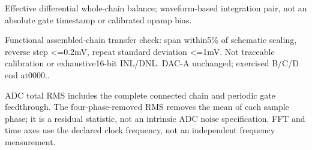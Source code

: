 Effect\allowbreak{}ive differ\allowbreak{}ential\allowbreak{} whole-\allowbreak{}chain balanc\allowbreak{}e; wavefo\allowbreak{}rm-\allowbreak{}based integr\allowbreak{}ation pair,\allowbreak{} not an absolu\allowbreak{}te gate timest\allowbreak{}amp or calibr\allowbreak{}ated opamp bias.

Functi\allowbreak{}onal assemb\allowbreak{}led-\allowbreak{}chain transf\allowbreak{}er check: span within\allowbreak{}5\% of schema\allowbreak{}tic scalin\allowbreak{}g,\allowbreak{} revers\allowbreak{}e step <=0.2mV,\allowbreak{} repeat\allowbreak{} standa\allowbreak{}rd deviat\allowbreak{}ion <=1mV. Not tracea\allowbreak{}ble calibr\allowbreak{}ation or exhaus\allowbreak{}tive16\allowbreak{}-\allowbreak{}bit INL/\allowbreak{}DNL. DAC-\allowbreak{}A unchan\allowbreak{}ged; exerci\allowbreak{}sed B/\allowbreak{}C/\allowbreak{}D end at0000\allowbreak{}..

ADC total RMS includes the complete connected chain and periodic gate feedthrough. The four-phase-removed RMS removes the mean of each sample phase; it is a residual statistic, not an intrinsic ADC noise specification. FFT and time axes use the declared clock frequency, not an independent frequency measurement.


